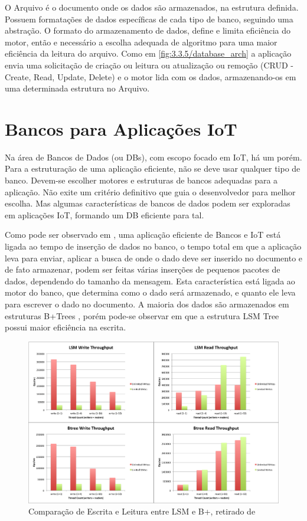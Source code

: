 O Arquivo é o documento onde os dados são armazenados, na estrutura definida. Possuem formatações de dados específicas de cada tipo de banco, seguindo uma abstração. O formato do armazenamento de dados, define e limita eficiência do motor, então e necessário a escolha adequada de algoritmo para uma maior eficiência da leitura do arquivo. Como em \ref{fig:3.3.5/database_arch} a aplicação envia uma solicitação de criação ou leitura ou atualização ou remoção (CRUD - Create, Read, Update, Delete) e o motor lida com os dados, armazenando-os em uma determinada estrutura no Arquivo.


 
\section{Bancos para Aplicações IoT}
\label{section:bancos_IoT}

Na área de Bancos de Dados (ou DBs), com escopo focado em IoT, há um porém. Para a estruturação de uma aplicação eficiente, não se deve usar qualquer tipo de banco. Devem-se escolher motores e estruturas de bancos adequadas para a aplicação. Não exite um critério definitivo que guia o desenvolvedor para melhor escolha. Mas algumas características de bancos de dados podem ser exploradas em aplicações IoT, formando um DB eficiente para tal.

Como pode ser observado em \cite{Damodaran}, uma aplicação eficiente de Bancos e IoT está ligada ao tempo de inserção de dados no banco,  o tempo total em que a aplicação leva para enviar, aplicar a busca de onde o dado deve ser inserido no documento e de fato armazenar, podem ser feitas várias inserções de pequenos pacotes de dados, dependendo do tamanho da mensagem. Esta característica está ligada ao motor do banco, que determina como o dado será armazenado, e quanto ele leva para escrever o dado no documento. A maioria dos dados são armazenados em estruturas B+Trees \cite{b-tree}, porém pode-se observar em \cite{Damodaran} que a estrutura LSM Tree \cite{O'Neal-Gawlick-Cheng} possui maior eficiência na escrita.


\begin{figure}[h!]
\centering
\includegraphics[width=14cm]{./02_Capitulos/02_Cap3/figures/LSM_btree}
\caption{Comparação de Escrita e Leitura entre LSM e B+, retirado de \cite{btrees-vs-lsmtrees}}
\label{fig:3.3.5/b-lsm}
\end{figure}

